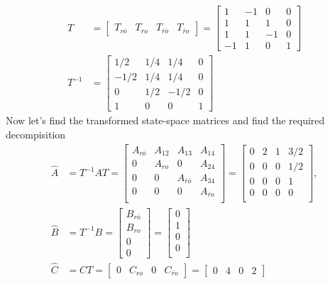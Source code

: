 \documentclass[twoside]{article}
\begin{document}
%
\begin{align*}
   T &= \left[ \begin{array}{c|c|c|c} T_{r\bar{o}} & T_{ro} & T_{\bar{r} \bar{o}} & T_{\bar{r} o} \end{array} \right] 
   = \left[ \begin{array}{c|c|c|c} 1 & -1 & 0 & 0
   \\
   1 & 1 & 1 & 0
   \\
   1 & 1 & -1 & 0
   \\
   -1 & 1 & 0 & 1
   \end{array} \right] 
   \\
   T^{-1} &= \left[ \begin{array}{c|c|c|c} 1/2 & 1/4 & 1/4 & 0
   \\
   -1/2 & 1/4 & 1/4 & 0
   \\
   0 & 1/2 & -1/2 & 0
   \\
   1 & 0 & 0 & 1
   \end{array} \right] 
\end{align*}
%
Now let's find the transformed state-space matrices 
and find the required decompisition
\begin{align*}
    \hat{A} &= T^{-1} A T =  
    \left[ \begin{array}{c|c|c|c} A_{r\bar{o}} & A_{12} & A_{13} & A_{14} \\ \hline 
    0 & A_{ro} & 0 & A_{24} \\ \hline 
    0 & 0 & A_{\bar{r}\bar{o}} & A_{34} \\ \hline 
    0 & 0 & 0 & A_{\bar{r}o} \\ 
    \end{array} \right] =
    \left[ \begin{array}{c|c|c|c} 0 & 2 & 1 & 3/2 \\ \hline 
    0 & 0 & 0 & 1/2 \\ \hline 
    0 & 0 & 0 & 1 \\ \hline 
    0 & 0 & 0 & 0 \\ 
    \end{array} \right] ,
    \\
    \hat{B} &= T^{-1} B = \left[ \begin{array}{c} B_{r\bar{o}} \\ B_{ro} \\ 0 \\ 0 \end{array} \right]
    =
    \left[ \begin{array}{c} 0  \\ \hline 
    1 \\ \hline 
    0 \\ \hline 
    0 \\ 
    \end{array} \right] \\
    \hat{C} &= C T = \left[ \begin{array}{c|c|c|c} 0 & C_{ro} & 0 & C_{\bar{r}o} \end{array} \right] =
    \left[ \begin{array}{c|c|c|c} 0 & 4 & 0 & 2 \end{array} \right]
\end{align*}
\end{document}

